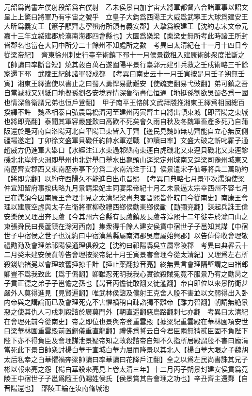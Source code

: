 元韶爲尚書左僕射段韶爲右僕射　乙未侯景自加宇宙大將軍都督六合諸軍事以詔文呈上上驚曰將軍乃有宇宙之號乎　立皇子大鈞爲西陽王大威爲武寧王大球爲建安王大昕爲義安王【簫子顒齊志寧蠻府所領有義安郡】大摯爲綏建王【沈約志宋文帝元嘉十三年立綏建郡於漢南海郡四會縣也】大圜爲樂梁【樂梁史無所考此時諸王所封皆郡名也當在大同中所分二十餘州不知處所之數　考異曰太清紀在十一月十四日今從梁帝紀】　齊東徐州刺史行臺辛術鎮下邳十一月侯景徵租入建康術帥衆度淮斷之【帥讀曰率斷音短】燒其穀百萬石遂圍陽平景行臺郭元建引兵救之壬戍術略三千餘家還下邳　武陵王紀帥諸軍發成都　【考異曰南史云十一月壬寅按是月壬子朔無壬寅】湘東王繹遣使以書止之曰蜀人勇悍易動難安【使疏吏翻易弋䜴翻】弟可鎮之吾自當滅賊又别紙曰地擬孫劉各安境界情深魯衛書信恒通【地挺孫劉欲吳蜀各爲一國也情深魯衛謂兄弟也恒戶登翻】　甲子南平王恪帥文武拜牋推湘東王繹爲相國總百揆繹不許　魏丞相泰自弘農爲橋濟河至建州丙寅齊主自將出頓東城【即晉陽之東城也將即亮翻】泰聞其軍容嚴盛歎曰高歡不死矣會久雨自秋及冬魏軍畜產多死乃自蒲阪還於是河南自洛陽河北自平陽已東皆入于齊【邊民見魏師無功齊能自立心無反側疆場遂定】丁卯徐文盛軍貝磯任約帥水軍逆戰【帥讀曰率】文盛大破之斬叱羅子通趙威方仍進軍大舉口【水經注江水東過邾縣南東逕白虎磯北又東逕貝磯北又東逕黎磯北北岸烽火洲即舉州也北對舉口舉水出龜頭山逕梁定州城南又逕梁司豫州城東又南歷齊安郡西又東南歷赤亭下分爲二水南流注于江】侯景遣宋子仙等將兵二萬助約【將即亮翻】以約守西陽久不能進自出屯晋熙　【考異曰典略七月景軍次濡須使梁仲宣知留府事按典略九月景請梁妃主同宴梁帝紀十月乙未景逼太宗幸西州不容七月已在濡須今因南康王會理事見之太清紀梁書典畧晋熙皆作皖口今從南史】南康王會理以建康空虚與太子左衛將軍柳敬禮西鄉侯勸東鄉侯勔【勔彌兖翻】謀起兵誅王偉安樂侯乂理出奔長蘆【今其州六合縣有長蘆鎮及長蘆寺淳熙十二年徙寺於滁口山之東張舜民曰長蘆鎮在滁河西南】集衆得千餘人建安侯賁中宿世子子邕知其謀【中宿世子中宿侯之世子也沈約曰中宿漢舊縣屬南海郡吳度屬始興郡】以告偉偉收會理敬禮勸勔及會理弟祁陽侯通理俱殺之【沈約曰祁陽縣吳立屬零陵郡　考異曰典畧云十二月癸未建安侯賁等告會理按梁帝紀十月壬寅景害會理今從太清紀】乂理爲左右所殺錢塘禇冕以會理故舊捶掠千計【捶止蘂翻掠音亮】終無異言會理隔壁謂之曰禇郎卿豈不爲我致此【爲于僞翻】卿雖忍死明我我心實欲殺賊冕竟不服景乃宥之勸昺之子賁正德之弟子子邕憺之孫也【昺音丙憺徒敢翻又徒濫翻】帝自即位以來景防衛甚嚴外人莫得進見【見賢遍翻】唯武林侯諮及僕射王克舍人殷不害並以文弱得出入卧内帝與之講論而已及會理死克不害懼禍稍自疎諮獨不離帝【離力智翻】朝請無絶景惡之使其仇人刁戍刺殺諮於廣莫門外【朝直遥翻惡烏路翻刺七亦翻　考異曰太清紀在會理死前今從南史】帝之即位也景與帝登重雲殿【據梁紀重雲殿在華林園項安世曰梁華林園重雲殿前置銅儀重直龍翻】禮佛爲誓云自今君臣兩無猜貳臣固不負陛下陛下亦不得負臣及會理謀泄景疑帝知之故殺諮帝自知不久指所居殿謂殷不害曰龐涓當死此下景自帥衆討楊白華于宣城白華力屈而降景以其北人【楊白華大眼之子魏胡太后私幸之白華懼禍奔梁帥讀曰率華讀曰花降戶江翻】全之以爲左民尚書誅其兄子彬以報來亮之怨【楊白華殺來亮見上卷太清三年】十二月丙子朔景封建安侯賁爲竟陵王中宿世子子邕爲隨王仍賜姓侯氏【侯景賞其告會理之功也】辛丑齊主還鄴【自晋陽還也】　邵陵王綸在汝南脩城池

